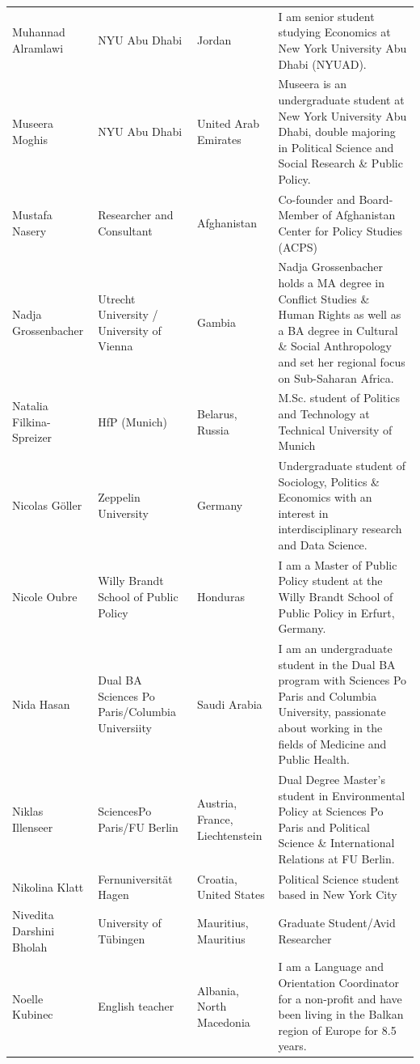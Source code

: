 \documentclass[
]{article}
\begin{document}
\begin{longtable}[t]{l>{\raggedright\arraybackslash}p{2cm}>{\raggedright\arraybackslash}p{2cm}>{\raggedright\arraybackslash}p{3cm}}
\rowcolor{gray!6}  Muhannad Alramlawi & NYU Abu Dhabi & Jordan & I am senior student studying Economics at New York University Abu Dhabi (NYUAD).\\
Museera Moghis & NYU Abu Dhabi & United Arab Emirates & Museera is an undergraduate student at New York University Abu Dhabi, double majoring in Political Science and Social Research \& Public Policy.\\
\addlinespace
\rowcolor{gray!6}  Mustafa Nasery & Researcher and Consultant & Afghanistan & Co-founder and Board-Member of Afghanistan Center for Policy Studies (ACPS)\\
Nadja Grossenbacher & Utrecht University / University of Vienna & Gambia & Nadja Grossenbacher holds a MA degree in Conflict Studies \& Human Rights as well as a BA degree in Cultural \& Social Anthropology and set her regional focus on Sub-Saharan Africa.\\
\rowcolor{gray!6}  Natalia Filkina-Spreizer & HfP (Munich) & Belarus, Russia & M.Sc. student of Politics and Technology at Technical University of Munich\\
Nicolas Göller & Zeppelin University & Germany & Undergraduate student of Sociology, Politics \& Economics with an interest in interdisciplinary research and Data Science.\\
\rowcolor{gray!6}  Nicole Oubre & Willy Brandt School of Public Policy & Honduras & I am a Master of Public Policy student at the Willy Brandt School of Public Policy in Erfurt, Germany.\\
\addlinespace
Nida Hasan & Dual BA Sciences Po Paris/Columbia Universiity & Saudi Arabia & I am an undergraduate student in the Dual BA program with Sciences Po Paris and Columbia University, passionate about working in the fields of Medicine and Public Health.\\
\rowcolor{gray!6}  Niklas Illenseer & SciencesPo Paris/FU Berlin & Austria, France, Liechtenstein & Dual Degree Master's student in Environmental Policy at Sciences Po Paris and Political Science \& International Relations at FU Berlin.\\
Nikolina Klatt & Fernuniversität Hagen & Croatia, United States & Political Science student based in New York City\\
\rowcolor{gray!6}  Nivedita Darshini Bholah & University of Tübingen & Mauritius, Mauritius & Graduate Student/Avid Researcher\\
Noelle Kubinec & English teacher & Albania, North Macedonia & I am a Language and Orientation Coordinator for a non-profit and have been living in the Balkan region of Europe for 8.5 years.\\

\end{longtable}
\end{document}
